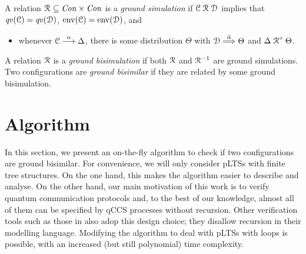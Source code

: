 \documentclass[a4paper,UKenglish,cleveref, autoref]{lipics-v2019}
\newcommand{\ptr}{{\rm env}}
\newcommand{\lift}[1]{\mathrel{{#1}^\circ}}
\newcommand{\Con}{{\it Con}}
\newcommand{\qv}{{\it qv}}
\newcommand{\CC}{{\cal C}}
\newcommand{\CD}{{\cal D}}
\begin{document}
\begin{definition}[\cite{DF12}]
	A relation $\aRel\ \subseteq \Con\times\Con$ is a \emph{ground simulation} if
	$\CC\aRel \CD$ implies that $\qv(\CC)=\qv(\CD)$, $\ptr(\CC)=\ptr(\CD)$,
	and
	\begin{itemize}
		\item whenever $\CC\ar{\alpha} \Delta$, there is some distribution $\Theta$ with $\CD\dar{\hat{\alpha}}\Theta$ and $\Delta \lift{\aRel} \Theta$.
	\end{itemize}
	A relation $\mathrel{{\mathcal R }}$ is a \emph{ground bisimulation} if both $\mathrel{{\mathcal R }}$ and
	$\mathrel{{\mathcal R }}^{-1}$ are ground simulations. Two configurations are \emph{ground bisimilar} if they are related by some ground bisimulation.
\end{definition}

\section{Algorithm}
\label{sec:algorithm}
In this section, we present an on-the-fly algorithm to check if two configurations are ground bisimilar.
For convenience, we will only consider pLTSs with finite tree structures. On the one hand, this makes the algorithm easier to describe and analyse. On the other hand, our main motivation of this work is to verify quantum communication protocols and, to the best of our knowledge, almost all of them can be specified by qCCS processes without recursion. 
Other verification tools such as those in \cite{KKKKS16,AL18} also adop this design choice; they disallow recursion in their modelling language.
Modifying the algorithm to deal with pLTSs with loops is possible, with an increased (but still polynomial) time complexity.
\end{document}
